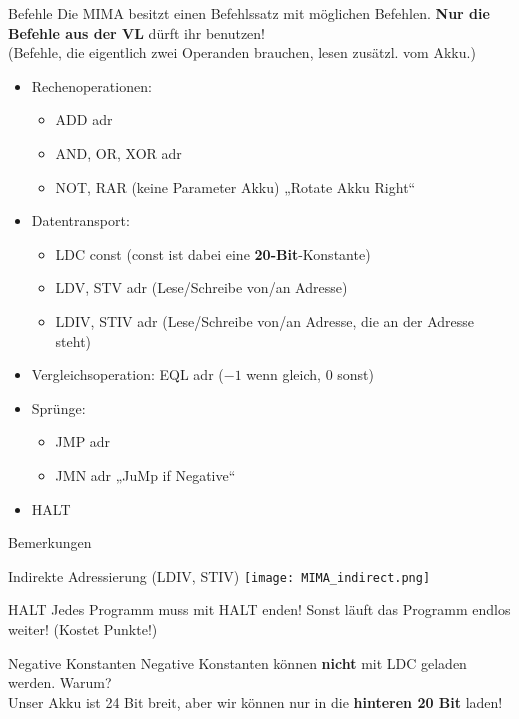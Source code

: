 \newcommand{\itemizeconfig}{\setlength{\parsep}{0pt}\setlength{\parskip}{0pt}\setlength{\topsep}{0pt}\setlength{\partopsep}{0pt}}
\begin{frame}{Befehle}
	Die MIMA besitzt einen Befehlssatz mit möglichen Befehlen. %
	\textbf{Nur die Befehle aus der VL} dürft ihr benutzen! \\ 
	\smallskip
	(Befehle, die eigentlich zwei Operanden brauchen, lesen zusätzl. vom Akku.)
	{
	\begin{itemize}[<+->] \itemizeconfig
		\item Rechenoperationen:
		\begin{itemize} 
			\item ADD adr 
			\item AND, OR, XOR adr
			\item NOT, RAR \quad (keine Parameter \impl Akku) \quad „Rotate Akku Right“
		\end{itemize}
		\item Datentransport:
		\begin{itemize}
			\item LDC const \quad (const ist dabei eine \textbf{20-Bit}-Konstante)
			\item LDV, STV adr \quad (Lese/Schreibe von/an Adresse)
			\item LDIV, STIV adr \quad (Lese/Schreibe von/an Adresse, die an der Adresse steht)
		\end{itemize}
		\item Vergleichsoperation: EQL adr \quad ($-1$ wenn gleich, 0 sonst)
		\item Sprünge:
		\begin{itemize}
			\item JMP adr
			\item JMN adr \quad „JuMp if Negative“
		\end{itemize}
		\item HALT
	\end{itemize}}
\end{frame}

\begin{frame}{Bemerkungen}
	\begin{block}{Indirekte Adressierung (LDIV, STIV)}
		\centering
		\texttt{[image: MIMA\_indirect.png]}
	\end{block}
	
	\pause
	\begin{block}{HALT}
		Jedes Programm muss mit HALT enden! Sonst läuft das Programm endlos weiter! (Kostet Punkte!)
	\end{block}

	\pause
	\begin{block}{Negative Konstanten}
		Negative Konstanten können \textbf{nicht} mit LDC geladen werden. Warum? \\
		\pause \impl Unser Akku ist 24 Bit breit, aber wir können nur in die \textbf{hinteren 20 Bit} laden!
	\end{block}
\end{frame}


